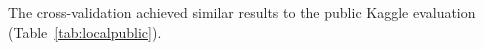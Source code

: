 The cross-validation achieved similar results to the public
Kaggle evaluation (Table~\ref{tab:localpublic}).